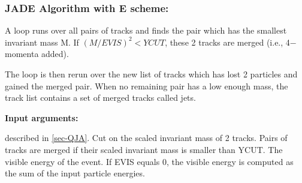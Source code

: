 \par
\subsubsection{\label{sec-QJMMCL}JADE Algorithm with E scheme:}
\par
{}
\par
A loop runs over all pairs of tracks and finds the pair which has
the
smallest invariant mass M.
If $
(M/EVIS)^{2}<YCUT
$, these 2 tracks are merged
(i.e., 4$-$momenta added).
\par The loop is then rerun over the new list of tracks which has
lost
2 particles and gained the merged pair. When no remaining pair has
a
low enough mass, the track list contains a set of merged
tracks called jets.
\par
{\bf Input arguments:}
\begin{indentlist}{ 2.50cm}{ 2.75cm}
described in \ref{sec-QJA}.
Cut on the scaled invariant mass of 2 tracks.
Pairs of tracks are merged if their scaled invariant mass is smaller
than YCUT.
The visible energy of the event.
If EVIS equals 0, the visible energy is computed as the sum of the
input particle energies.
\end{indentlist}
 
